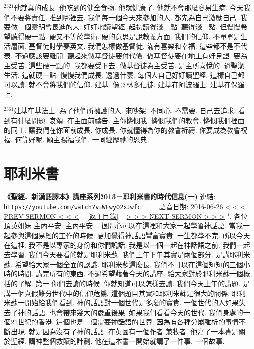 \documentclass{book}
\begin{document}
$^{2321}$他就真的成長.
他吃到的健全食物.
他就健康了.
他就不會那麼容易生病.
今天我們不要將責任.
推到哪裡去.
我們每一個今天來參加的人.
都先為自己激勵自己.
我要做一個靈明會長進的人.
好好地讀聖經.
起初讀得淺一點.
聽得淺一點.
但慢慢希望聽得硬一點.
硬又不等於學術.
硬的意思是說教義方面.
我們的信仰.
不單單是生活層面.
基督徒討學夢英文.
我們怎樣做基督徒.
滿有喜樂和幸福.
這些都不是不代表.
不過應該要離開.
聽起來做基督徒要付代價.
做基督徒要在地上有好見證.
要為主受苦.
這些硬一點的.
我都要受下去.
做基督徒為主受苦.
是主所喜悅的.
過聖潔生活.
這就硬一點.
慢慢我們成長.
透過什麼.
每個人自己好好讀聖經.
這樣自己都可以讀.
就不會將我們的信仰.
建基.
像哥林多信徒.
建基在阿波羅上.
建基在保羅上.

$^{2361}$建基在基法上.
為了他們所擁護的人.
來吵架.
不同心.
不需要.
自己去追求.
看到有什麼問題.
哀頌.
在主面前禱告.
主你憐憫我.
憐憫我們的教會.
憐憫我們裡面的同工.
讓我們在你面前成長.
你成長.
你就懂得為你的教會祈禱.
你要成為教會祝福.
何等好呢.
願主賜福我們.
一同經歷祂的恩典.
\newpage



\section{耶利米書}
\label{sec:WEwyO2xJwfc}
\textbf{《聖經．新漢語譯本》講座系列2013－耶利米書的時代信息(一)}
\newline
\newline
連結: \href{https://youtube.com/watch?v=WEwyO2xJwfc}{\texttt{ https://youtube.com/watch?v=WEwyO2xJwfc}} ~~~~ 語音日期: 2016-06-26 
\newline
\newline
\hyperref[sec:L7Klx5S64nM]{\small{< < < PREV SERMON < < <}}
~
\hyperref[sec:index]{\small{[返主目錄]}}
~
\hyperref[sec:7tQS0En6sh8]{\small{> > > NEXT SERMON > > >}}
\newline
\newline
$^{1}$.
各位頂英姐妹 主內平安.
主內平安.
.
很開心可以在這裡和大家一起學習神話語.
當我一起參與這個易經的工作的時候.
更加覺得神話語豐富寶貴.
一生都學不完.
所以今天在這裡.
我不是以專家的身份和你們說話.
我是以一個一起在神話語之前.
我們一起去學習.
我們今天要看的就是耶利米蘇.
我們上午下午其實是兩個部分.
是講耶利米蘇.
希望給大家一個全面的認識.
耶利米蘇這麼長.
我們不可以在這個短短的三個小時的時間.
講完所有的東西.
不過希望藉著今天的講座.
給大家對於耶利米蘇一個概括的了解.
第一 你們去讀的時候.
你就知道可以怎樣去讀.
我們今天上午的講題.
是講一個真假難分世代中的信仰危機.
這個題目其實和耶利米蘇是很大的關係.
耶利米蘇一開始給我們看到.
神的話語對一個世代是多麼的寶貴.
一個世代的人如果失去了神的話語.
也會帶來幾大的嚴重後果.
如果我們看看今天的世代.
我們身處的一個21世紀的香港.
這個也是一個需要神話語的世界.
因為有各種分崩離析的事情不斷出現.
就是因為沒有了神的話語.
在英國有一個作者 兼牧者.
他寫了一本書是關於聖經.
講神整個救贖的計劃.
他在這本書一開始就講了一件事.
一個故事.
\end{document}
